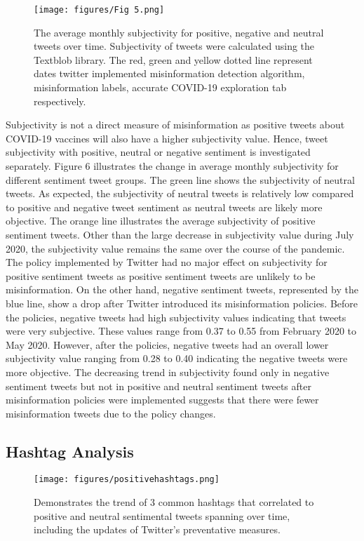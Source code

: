 \documentclass[10pt,twocolumn,letterpaper]{article}
\begin{document}
\begin{figure}[H]
  \centering
  \texttt{[image: figures/Fig 5.png]}
  \caption{The average monthly subjectivity for positive, negative and neutral tweets over time. Subjectivity of tweets were calculated using the Textblob library. The red, green and yellow dotted line represent dates twitter implemented misinformation detection algorithm, misinformation labels, accurate COVID-19 exploration tab respectively.}
\end{figure}
Subjectivity is not a direct measure of misinformation as positive tweets about COVID-19 vaccines will also have a higher subjectivity value. Hence, tweet subjectivity with positive, neutral or negative sentiment is investigated separately. Figure 6 illustrates the change in average monthly subjectivity for different sentiment tweet groups. The green line shows the subjectivity of neutral tweets. As expected, the subjectivity of neutral tweets is relatively low compared to positive and negative tweet sentiment as neutral tweets are likely more objective. The orange line illustrates the average subjectivity of positive sentiment tweets. Other than the large decrease in subjectivity value during July 2020, the subjectivity value remains the same over the course of the pandemic. The policy implemented by Twitter had no major effect on subjectivity for positive sentiment tweets as positive sentiment tweets are unlikely to be misinformation. On the other hand, negative sentiment tweets, represented by the blue line, show a drop after Twitter introduced its misinformation policies. Before the policies, negative tweets had high subjectivity values indicating that tweets were very subjective. These values range from 0.37 to 0.55 from February 2020 to May 2020. However, after the policies, negative tweets had an overall lower subjectivity value ranging from 0.28 to 0.40 indicating the negative tweets were more objective. The decreasing trend in subjectivity found only in negative sentiment tweets but not in positive and neutral sentiment tweets after misinformation policies were implemented suggests that there were fewer misinformation tweets due to the policy changes.


\subsection{Hashtag Analysis}
\begin{figure}[H]
  \centering
  \texttt{[image: figures/positivehashtags.png]}
  \caption{Demonstrates the trend of 3 common hashtags that correlated to positive and neutral sentimental tweets spanning over time, including the updates of Twitter's preventative measures.}
\end{figure}
\end{document}
